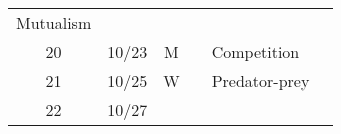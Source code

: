 \documentclass[]{article}
\begin{document}
\begin{longtable}[]{@{}ccclll@{}}
\begin{minipage}[t]{0.12\columnwidth}
Mutualism\strut
\end{minipage} & \begin{minipage}[t]{0.12\columnwidth}\raggedright\strut
\strut
\end{minipage}\tabularnewline
\begin{minipage}[t]{0.13\columnwidth}\centering\strut
20\strut
\end{minipage} & \begin{minipage}[t]{0.08\columnwidth}\centering\strut
10/23\strut
\end{minipage} & \begin{minipage}[t]{0.07\columnwidth}\centering\strut
M\strut
\end{minipage} & \begin{minipage}[t]{0.10\columnwidth}\raggedright\strut
\strut
\end{minipage} & \begin{minipage}[t]{0.12\columnwidth}\raggedright\strut
Competition\strut
\end{minipage} & \begin{minipage}[t]{0.12\columnwidth}\raggedright\strut
\strut
\end{minipage}\tabularnewline
\begin{minipage}[t]{0.13\columnwidth}\centering\strut
21\strut
\end{minipage} & \begin{minipage}[t]{0.08\columnwidth}\centering\strut
10/25\strut
\end{minipage} & \begin{minipage}[t]{0.07\columnwidth}\centering\strut
W\strut
\end{minipage} & \begin{minipage}[t]{0.10\columnwidth}\raggedright\strut
\strut
\end{minipage} & \begin{minipage}[t]{0.12\columnwidth}\raggedright\strut
Predator-prey\strut
\end{minipage} & \begin{minipage}[t]{0.12\columnwidth}\raggedright\strut
\strut
\end{minipage}\tabularnewline
\begin{minipage}[t]{0.13\columnwidth}\centering\strut
22\strut
\end{minipage} & \begin{minipage}[t]{0.08\columnwidth}\centering\strut
10/27\strut
\end{minipage} & \begin{minipage}[t]{0.07\columnwidth}\centering\strut

\end{minipage}
\end{longtable}
\end{document}
